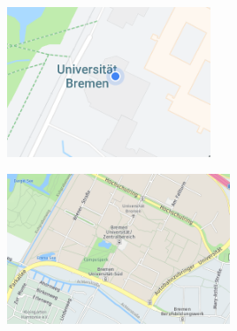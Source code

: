 \begin{figure}
    \centering
    \begin{minipage}[t]{.485\textwidth}
        \centering
        \vspace{0pt}
        \includegraphics[width=\linewidth, height=4.5cm]{figures/map-app_examples/gm_positionsmarker}
        \label{fig:gm_positionsmarker}
        \vfill
    \end{minipage}
    \hfill
    \begin{minipage}[t]{.485\textwidth}
        \centering
        \vspace{0pt}
        \includegraphics[width=\linewidth, height=4.5cm]{figures/map-app_examples/hwg_labels}
        \label{fig:hwg_labels}
    \end{minipage}
\end{figure}

